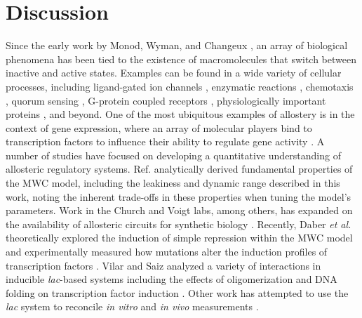 \section*{Discussion}

Since the early work by Monod, Wyman, and Changeux \cite{Monod1963,
MONOD1965}, an array of biological phenomena has been tied to the existence
of macromolecules that switch between inactive and active states. Examples
can be found in a wide variety of cellular processes, including ligand-gated
ion channels \cite{Auerbach2012}, enzymatic reactions \cite{Velyvis2007,
Einav2016}, chemotaxis \cite{Keymer2006}, quorum sensing \cite{Swem2008},
G-protein coupled receptors \cite{Canals2012}, physiologically important
proteins \cite{Milo2007, Levantino2012a}, and beyond. One of the most
ubiquitous examples of allostery is in the context of gene expression, where
an array of molecular players bind to transcription factors to influence
their ability to regulate gene activity \cite{Huang2011, Li2014}. A number of
studies have focused on developing a quantitative understanding of allosteric
regulatory systems. Ref. \cite{Martins2011, Marzen2013} analytically derived
fundamental properties of the MWC model, including the leakiness and dynamic
range described in this work, noting the inherent trade-offs in these
properties when tuning the model's parameters. Work in the Church and Voigt
labs, among others, has expanded on the availability of allosteric circuits
for synthetic biology \cite{Lutz1997, Moon2012, Rogers2015, Rohlhill2017}.
Recently, Daber \textit{et al.} theoretically explored the induction of
simple repression within the MWC model \cite{Daber2009} and experimentally
measured how mutations alter the induction profiles of transcription factors
\cite{Daber2011a}. Vilar and Saiz analyzed a variety of interactions in
inducible \textit{lac}-based systems including the effects of oligomerization
and DNA folding on transcription factor induction \cite{Leonor2008,
Vilar2013}. Other work has attempted to use the \textit{lac} system to
reconcile \textit{in vitro} and \textit{in vivo} measurements
\cite{Tungtur2011, Sochor2014}.

